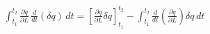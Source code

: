 \documentclass[preview]{standalone}
\begin{document}
\begin{align*}
\int_{t_1}^{t_2} \frac{\partial \dot{q}}{\partial L} \, \frac{d}{dt} (\delta q) \, dt = \left[ \frac{\partial \dot{q}}{\partial L} \delta q \right]_{t_1}^{t_2} - \int_{t_1}^{t_2} \frac{d}{dt} \left( \frac{\partial \dot{q}}{\partial L} \right) \delta q \, dt
\end{align*}
\end{document}
